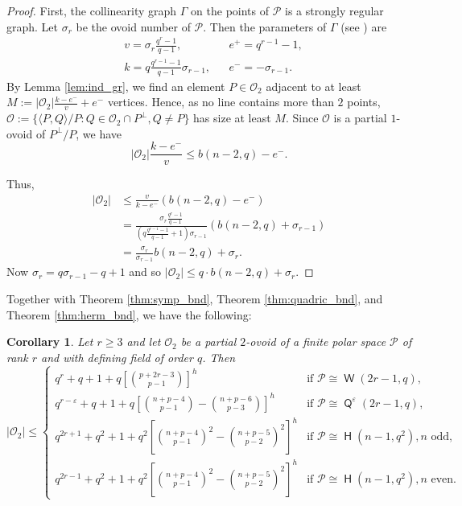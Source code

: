 \documentclass[a4paper,11pt]{amsproc}
\theoremstyle{plain}
\newtheorem{Corollary} [Theorem] {Corollary}
\theoremstyle{definition}
\newcommand{\eps}{\varepsilon}
\newcommand{\<}{\langle}
\renewcommand{\>}{\rangle} %
\newcommand{\onum}{\sigma}
\DeclareMathOperator\h{\mathsf{H}}
\DeclareMathOperator\w{\mathsf{W}}
\DeclareMathOperator\q{\mathsf{Q}}
\begin{document}
\begin{proof}
First, the collinearity graph $\Gamma$ on the points of $\mathcal{P}$
is a strongly regular graph. Let $\onum_r$ be the ovoid number of $\mathcal{P}$.
Then the parameters of $\Gamma$ (see \cite[\S2.5.2]{BvM})
are
\begin{align*}
  & v = \onum_r \frac{q^r-1}{q-1}, && e^+ = q^{r-1}-1,\\
  & k = q\frac{q^{r-1}-1}{q-1}\onum_{r-1}, && e^- = -\onum_{r-1}.
\end{align*}
By Lemma \ref{lem:ind_gr}, we find an element $P \in \mathcal{O}_2$ adjacent 
to at least $M := |\mathcal{O}_2| \frac{k-e^-}{v} + e^-$ vertices.
Hence, as no line contains more than $2$ points, 
$\mathcal{O} := \{ \< P, Q \>/P: Q \in {\mathcal{O}_2 \cap P^\perp, Q \neq P}\}$ has size at least $M$.
Since $\mathcal{O}$ is a partial $1$-ovoid of $P^\perp/P$,
we have 
  \[
    |\mathcal{O}_2| \frac{k-e^-}{v} \leq b(n-2, q) - e^-.
  \]

Thus,
\begin{align*}
|\mathcal{O}_2| &\le \frac{v}{k-e^-}\left(b(n-2, q) - e^-\right)\\
&=\frac{\onum_r \frac{q^r-1}{q-1}}{ (q\frac{q^{r-1}-1}{q-1}+1)\onum_{r-1}}
\left(b(n-2, q) +\onum_{r-1}\right)\\
&=\frac{\onum_r}{ \onum_{r-1}}b(n-2, q)+ \onum_r.
\end{align*}
Now $\onum_r = q\onum_{r-1}-q+1$ and so $|\mathcal{O}_2| \le q \cdot b(n-2, q)+ \onum_r$.
\end{proof}


Together with Theorem \ref{thm:symp_bnd}, Theorem \ref{thm:quadric_bnd},
and Theorem \ref{thm:herm_bnd}, we have the following:

\begin{Corollary}\label{partial2ovoids_corollary}
  Let $r\ge 3$ and let $\mathcal{O}_2$ be a partial $2$-ovoid of a finite polar space $\mathcal{P}$ of rank $r$
  and with defining field of order $q$. Then
  \[
      |\mathcal{O}_2| \le
  \begin{cases}
 q^{r} + q+1+ q \left[ \binom{p+2r-3}{p-1} \right]^h  & \text{if }\mathcal{P}\cong\w(2r-1,q),\\
 q^{r-\eps}+q+1 + q \left[ \binom{n+p-4}{p-1} - \binom{n+p-6}{p-3} \right]^h 
 & \text{if }\mathcal{P}\cong\q^\eps(2r-1,q),\\%
 q^{2r+ 1}+q^2+1+ q^2 \left[ \binom{n+p-4}{p-1}^2 - \binom{n+p-5}{p-2}^2 \right]^h 
  & \text{if }\mathcal{P}\cong\h(n-1,q^2), n\text{ odd},\\
   q^{2r- 1}+q^2+1 + q^2 \left[ \binom{n+p-4}{p-1}^2 - \binom{n+p-5}{p-2}^2 \right]^h 
  & \text{if }\mathcal{P}\cong\h(n-1,q^2), n\text{ even}.
  \end{cases}
    \]
\end{Corollary}
\end{document}
